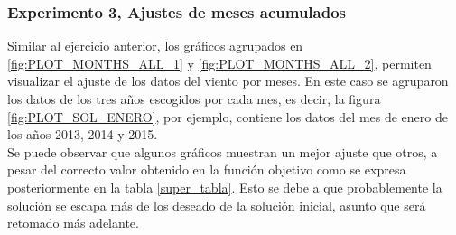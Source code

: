 \subsubsection{Experimento 3, Ajustes de meses acumulados}
Similar al ejercicio anterior, los gráficos agrupados en \ref{fig:PLOT_MONTHS_ALL_1} y \ref{fig:PLOT_MONTHS_ALL_2}, permiten visualizar el ajuste de los datos del viento por meses. En este caso se agruparon los datos de los tres años escogidos por cada mes, es decir, la figura \ref{fig:PLOT_SOL_ENERO}, por ejemplo, contiene los datos del mes de enero de los años 2013, 2014 y 2015.\\
Se puede observar que algunos gráficos muestran un mejor ajuste que otros, a pesar del correcto valor obtenido en la función objetivo como se expresa posteriormente en la tabla \ref{super_tabla}. Esto se debe a que probablemente la solución se escapa más de los deseado de la solución inicial, asunto que será retomado más adelante. 
